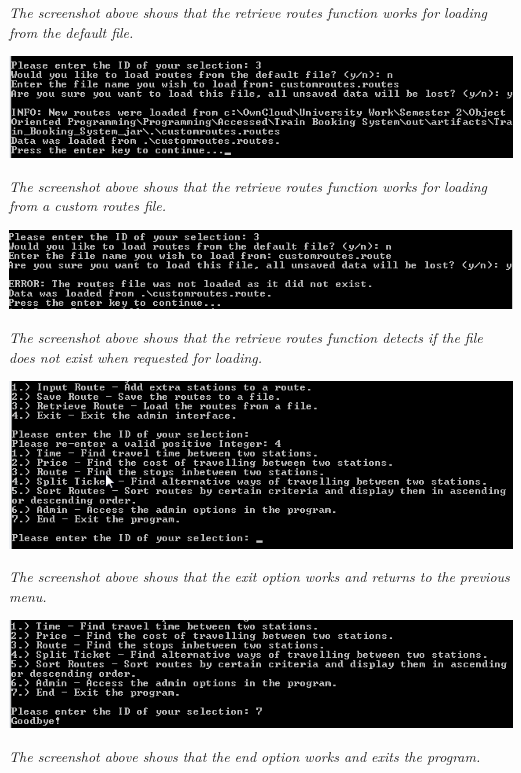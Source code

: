 \documentclass[10pt, a4paper]{article}
\begin{document}
\textit{The screenshot above shows that the retrieve routes function works for loading from the default file.}

\includegraphics{Functionality18.png}

\textit{The screenshot above shows that the retrieve routes function works for loading from a custom routes file.}

\includegraphics{Functionality19.png}

\textit{The screenshot above shows that the retrieve routes function detects if the file does not exist when requested for loading.}

\includegraphics{Functionality20.png}

\textit{The screenshot above shows that the exit option works and returns to the previous menu.}

\includegraphics{Functionality21.png}

\textit{The screenshot above shows that the end option works and exits the program.}
\end{document}
